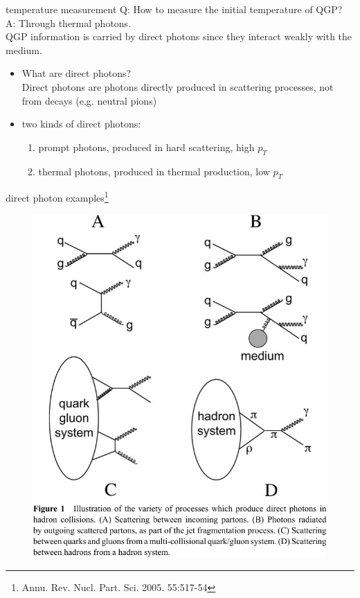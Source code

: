 \documentclass{beamer}
\begin{document}
\begin{frame}{temperature measurement}
Q: How to measure the initial temperature of QGP?\\
A: Through thermal photons.\\
QGP information is carried by direct photons since they interact weakly with the medium.
\begin{itemize}
  \item What are direct photons?\\
  Direct photons are photons directly produced in scattering processes, not from decays (e.g. neutral pions)
  \item two kinds of direct photons:
  \begin{enumerate}
    \item prompt photons, produced in hard scattering, high $p_T$
    \item thermal photons, produced in thermal production, low $p_T$
  \end{enumerate}
\end{itemize}
\end{frame}


\begin{frame}{direct photon examples\footnote{Annu. Rev. Nucl. Part. Sci. 2005. 55:517-54}}
  \begin{figure}
    \includegraphics[height=.8\textheight]{plots/direct_photon_examples.pdf}
  \end{figure}
\end{frame}
\end{document}
